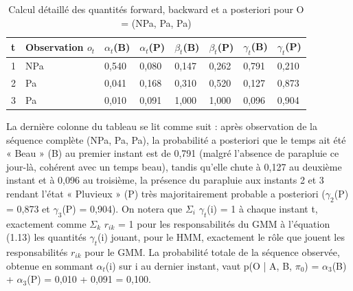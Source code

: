 \begin{table}[H]
\centering
\small
\setlength{\tabcolsep}{0.09cm}
\begin{tabular}{|p{1.71cm}|p{1.71cm}|p{1.71cm}|p{1.71cm}|p{1.71cm}|p{1.71cm}|p{1.71cm}|p{1.71cm}|}
\hline
\textbf{t} & \textbf{Observation $o_{t}$} & \textbf{$\alpha _{t}$(B)} & \textbf{$\alpha _{t}$(P)} & \textbf{$\beta _{t}$(B)} & \textbf{$\beta _{t}$(P)} & \textbf{$\gamma _{t}$(B)} & \textbf{$\gamma _{t}$(P)} \\
\hline
1 & NPa & 0,540 & 0,080 & 0,147 & 0,262 & 0,791 & 0,210 \\
\hline
2 & Pa & 0,041 & 0,168 & 0,310 & 0,520 & 0,127 & 0,873 \\
\hline
3 & Pa & 0,010 & 0,091 & 1,000 & 1,000 & 0,096 & 0,904 \\
\hline
\end{tabular}
\caption{Calcul détaillé des quantités forward, backward et a posteriori pour O = (NPa, Pa, Pa)}
\label{tab:1_4}
\end{table}
La dernière colonne du tableau se lit comme suit : après observation de la séquence complète (NPa, Pa, Pa), la probabilité a posteriori que le temps ait été « Beau » (B) au premier instant est de 0,791 (malgré l'absence de parapluie ce jour-là, cohérent avec un temps beau), tandis qu'elle chute à 0,127 au deuxième instant et à 0,096 au troisième, la présence du parapluie aux instants 2 et 3 rendant l'état « Pluvieux » (P) très majoritairement probable a posteriori ($\gamma _{2}$(P) = 0,873 et $\gamma _{3}$(P) = 0,904). On notera que $\Sigma _{i}$ $\gamma _{t}$(i) = 1 à chaque instant t, exactement comme $\Sigma _{k}$ $r_{ik}$ = 1 pour les responsabilités du GMM à l'équation (1.13)  les quantités $\gamma _{t}$(i) jouant, pour le HMM, exactement le rôle que jouent les responsabilités $r_{ik}$ pour le GMM. La probabilité totale de la séquence observée, obtenue en sommant $\alpha _{t}$(i) sur i au dernier instant, vaut p(O | A, B, $\pi _{0}$) = $\alpha _{3}$(B) + $\alpha _{3}$(P) = 0,010 + 0,091 = 0,100.

